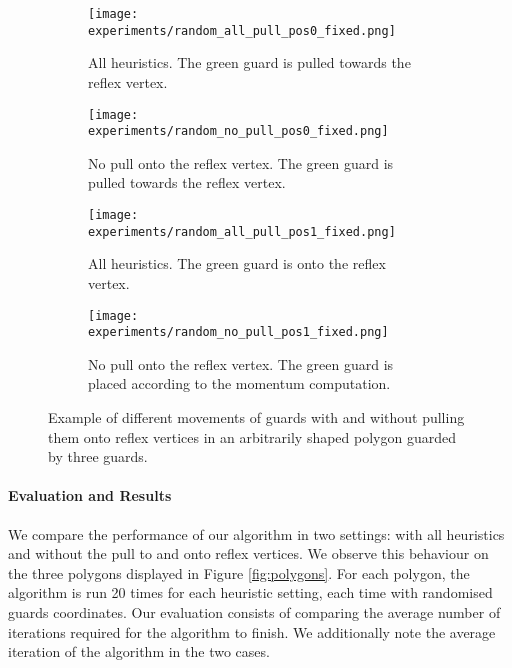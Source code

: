 \begin{figure}[h!]
    \centering
    \begin{subfigure}{0.45\textwidth}
        \texttt{[image: experiments/random\_all\_pull\_pos0\_fixed.png]}
        \caption{All heuristics. The green guard is pulled towards the reflex vertex.}
        \label{fig:all_pull_pos0}
    \end{subfigure}
    \hfill
    \begin{subfigure}{0.45\textwidth}
        \texttt{[image: experiments/random\_no\_pull\_pos0\_fixed.png]}
        \caption{No pull onto the reflex vertex. The green guard is pulled towards the reflex vertex.}
        \label{fig:no_pull_pos0}
    \end{subfigure}
    \begin{subfigure}{0.45\textwidth}
        \texttt{[image: experiments/random\_all\_pull\_pos1\_fixed.png]}
        \caption{All heuristics. The green guard is onto the reflex vertex.}
        \label{fig:all_pull_pos1}
    \end{subfigure}
    \hfill
    \begin{subfigure}{0.45\textwidth}
        \texttt{[image: experiments/random\_no\_pull\_pos1\_fixed.png]}
        \caption{No pull onto the reflex vertex. The green guard is placed according to the momentum computation.}
        \label{fig:no_pull_pos1}
    \end{subfigure}
    \caption{Example of different movements of guards with and without pulling them onto reflex vertices in an arbitrarily shaped polygon guarded by three guards.}
    \label{fig:no_pull_eg}
\end{figure}

\newpage
\paragraph{Evaluation and Results}
\label{evaluation}
We compare the performance of our algorithm in two settings: with all heuristics and without the pull to and onto reflex vertices. We observe this behaviour on the three polygons displayed in Figure \ref{fig:polygons}. For each polygon, the algorithm is run 20 times for each heuristic setting, each time with randomised guards coordinates. Our evaluation consists of comparing the average number of iterations required for the algorithm to finish. We additionally note the average iteration of the algorithm in the two cases.

